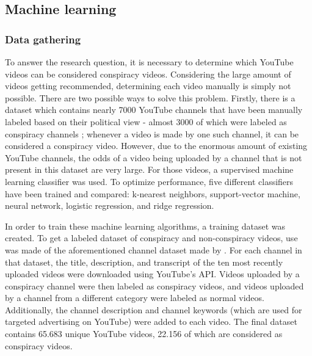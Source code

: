 \documentclass[../main.tex]{subfiles}
\begin{document}
\subsection{Machine learning} \label{Machine Learning}
\subsubsection{Data gathering}
To answer the research question, it is necessary to determine which YouTube videos can be considered
conspiracy videos. Considering the large amount of videos getting recommended, determining each video
manually is simply not possible. There are two possible ways to solve this problem. Firstly, there is a
dataset which contains nearly 7000 YouTube channels that have been manually labeled based on their
political view - almost 3000 of which were labeled as conspiracy channels \citep{ledwich2019algorithmic};
whenever a video is made by one such channel, it can be considered a conspiracy video. However, due to
the enormous amount of existing YouTube channels, the odds of a video being uploaded by a channel that
is not present in this dataset are very large. For those videos, a supervised machine learning
classifier was used. To optimize performance, five different classifiers have been trained and compared:
k-nearest neighbors, support-vector machine, neural network, logistic regression, and ridge regression. 

In order to train these machine learning algorithms, a training dataset was created. To get a labeled
dataset of conspiracy and non-conspiracy videos, use was made of the aforementioned channel dataset made
by \citet{ledwich2019algorithmic}. For each channel in that dataset, the title, description, and
transcript of the ten most recently uploaded videos were downloaded using YouTube's API. Videos uploaded
by a conspiracy channel were then labeled as conspiracy videos, and videos uploaded by a channel from a
different category were labeled as normal videos. Additionally, the channel description and channel
keywords (which are used for targeted advertising on YouTube) were added to each video. The final
dataset contains 65.683 unique YouTube videos, 22.156 of which are considered as conspiracy videos. 
\end{document}
